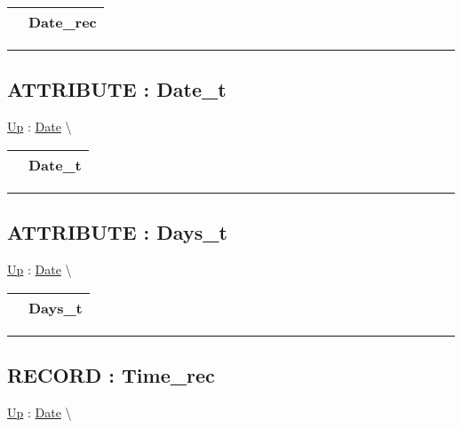 {\renewcommand{\arraystretch}{1.5}
\begin{tabularx}{\textwidth}{|>{\raggedright\arraybackslash}l|X|}
\hline
\hspace{0pt} & Date\_rec \\
\hline
\end{tabularx}
}

\par


\rule{\linewidth}{0.5pt}
\subsection*{ATTRIBUTE : Date\_t}
\hypertarget{ecldoc:date.date_t}{}
\hyperlink{ecldoc:Date}{Up} :
\hspace{0pt} \hyperlink{ecldoc:Date}{Date} \textbackslash 

{\renewcommand{\arraystretch}{1.5}
\begin{tabularx}{\textwidth}{|>{\raggedright\arraybackslash}l|X|}
\hline
\hspace{0pt} & Date\_t \\
\hline
\end{tabularx}
}

\par


\rule{\linewidth}{0.5pt}
\subsection*{ATTRIBUTE : Days\_t}
\hypertarget{ecldoc:date.days_t}{}
\hyperlink{ecldoc:Date}{Up} :
\hspace{0pt} \hyperlink{ecldoc:Date}{Date} \textbackslash 

{\renewcommand{\arraystretch}{1.5}
\begin{tabularx}{\textwidth}{|>{\raggedright\arraybackslash}l|X|}
\hline
\hspace{0pt} & Days\_t \\
\hline
\end{tabularx}
}

\par


\rule{\linewidth}{0.5pt}
\subsection*{RECORD : Time\_rec}
\hypertarget{ecldoc:date.time_rec}{}
\hyperlink{ecldoc:Date}{Up} :
\hspace{0pt} \hyperlink{ecldoc:Date}{Date} \textbackslash 

